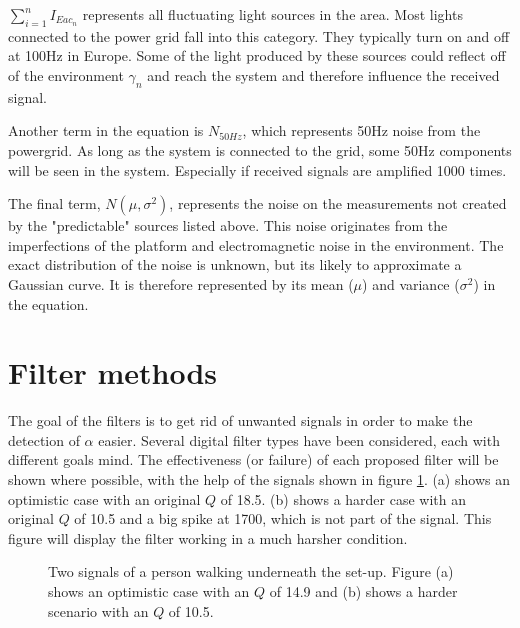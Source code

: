 $\sum_{i=1}^n I_{Eac{_n}}$ represents all fluctuating light sources in the area. Most lights connected to the power grid fall into this category. They typically turn on and off at 100Hz in Europe. Some of the light produced by these sources could reflect off of the environment $\gamma_{n}$ and reach the system and therefore influence the received signal.

Another term in the equation is $N_{50Hz}$, which represents 50Hz noise from the powergrid. As long as the system is connected to the grid, some 50Hz components will be seen in the system. Especially if received signals are amplified 1000 times.

The final term, $N(\mu,\sigma^2)$, represents the noise on the measurements not created by the "predictable" sources listed above. This noise originates from the imperfections of the platform and electromagnetic noise in the environment. The exact distribution of the noise is unknown, but its likely to approximate a Gaussian curve. It is therefore represented by its mean ($\mu$) and variance ($\sigma^2$) in the equation.

\section{Filter methods}
The goal of the filters is to get rid of unwanted signals in order to make the detection of $\alpha$ easier. Several digital filter types have been considered, each with different goals mind. The effectiveness (or failure) of each proposed filter will be shown where possible, with the help of the signals shown in figure \ref{Original_signal}. (a) shows an optimistic case with an original $Q$ of 18.5. (b) shows a harder case with an original $Q$ of 10.5 and a big spike at 1700, which is not part of the signal. This figure will display the filter working in a much harsher condition.

\begin{figure}
	\centering     %
	\caption{Two signals of a person walking underneath the set-up. Figure (a) shows an optimistic case with an $Q$ of 14.9 and (b) shows a harder scenario with an $Q$ of 10.5.\label{Original_signal}}
\end{figure}

